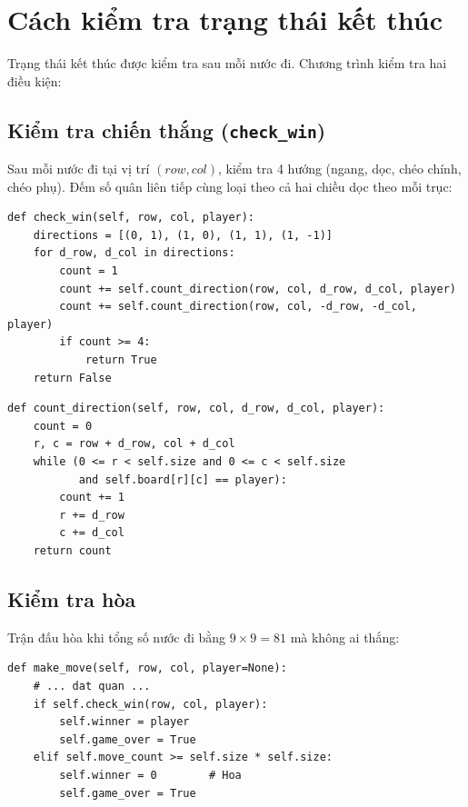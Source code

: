 \documentclass[12pt,a4paper]{article}
\begin{document}
\section{Cách kiểm tra trạng thái kết thúc}

Trạng thái kết thúc được kiểm tra sau mỗi nước đi. Chương trình kiểm tra hai điều kiện:

\subsection{Kiểm tra chiến thắng (\texttt{check\_win})}

Sau mỗi nước đi tại vị trí $(row, col)$, kiểm tra 4 hướng (ngang, dọc, chéo chính, chéo phụ). Đếm số quân liên tiếp cùng loại theo cả hai chiều dọc theo mỗi trục:

\begin{lstlisting}[caption={Kiểm tra chiến thắng}]
def check_win(self, row, col, player):
    directions = [(0, 1), (1, 0), (1, 1), (1, -1)]
    for d_row, d_col in directions:
        count = 1
        count += self.count_direction(row, col, d_row, d_col, player)
        count += self.count_direction(row, col, -d_row, -d_col, player)
        if count >= 4:
            return True
    return False
\end{lstlisting}

\begin{lstlisting}[caption={Đếm quân liên tiếp theo một hướng}]
def count_direction(self, row, col, d_row, d_col, player):
    count = 0
    r, c = row + d_row, col + d_col
    while (0 <= r < self.size and 0 <= c < self.size
           and self.board[r][c] == player):
        count += 1
        r += d_row
        c += d_col
    return count
\end{lstlisting}

\subsection{Kiểm tra hòa}

Trận đấu hòa khi tổng số nước đi bằng $9 \times 9 = 81$ mà không ai thắng:

\begin{lstlisting}[caption={Kiểm tra trạng thái kết thúc tổng quát}]
def make_move(self, row, col, player=None):
    # ... dat quan ...
    if self.check_win(row, col, player):
        self.winner = player
        self.game_over = True
    elif self.move_count >= self.size * self.size:
        self.winner = 0        # Hoa
        self.game_over = True
\end{lstlisting}
\end{document}
